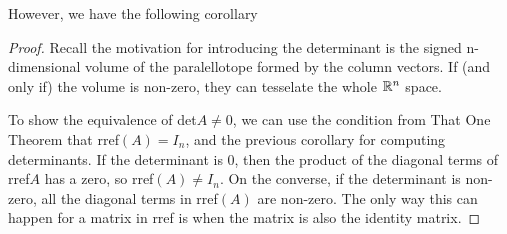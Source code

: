However, we have the following corollary 
\begin{proof}
	Recall the motivation for introducing the determinant is the signed n-dimensional volume of the paralellotope formed by the column vectors. If (and only if) the volume is non-zero, they can tesselate the whole $\mathbb{R}^n$ space.

	To show the equivalence of det$A\neq 0$, we can use the condition from That One Theorem that rref$(A)=I_n$, and the previous corollary for computing determinants. If the determinant is $0$, then the product of the diagonal terms of rref$A$ has a zero, so rref$(A)\neq I_n$. On the converse, if the determinant is non-zero, all the diagonal terms in rref$(A)$ are non-zero. The only way this can happen for a matrix in rref is when the matrix is also the identity matrix.
\end{proof}

